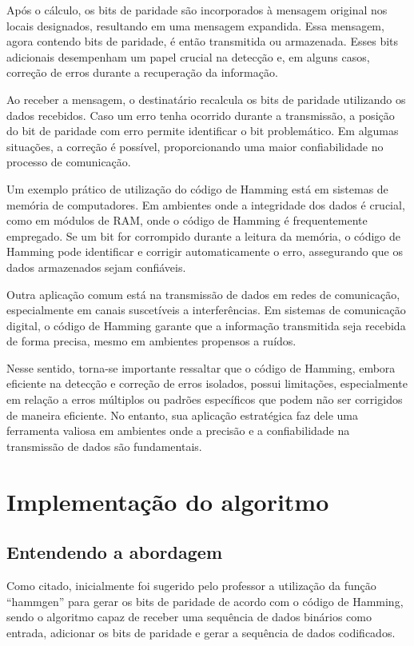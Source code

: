 \documentclass{article}
\begin{document}
Após o cálculo, os bits de paridade são incorporados à mensagem original nos locais designados, resultando em uma mensagem expandida. Essa mensagem, agora contendo bits de paridade, é então transmitida ou armazenada. Esses bits adicionais desempenham um papel crucial na detecção e, em alguns casos, correção de erros durante a recuperação da informação.

Ao receber a mensagem, o destinatário recalcula os bits de paridade utilizando os dados recebidos. Caso um erro tenha ocorrido durante a transmissão, a posição do bit de paridade com erro permite identificar o bit problemático. Em algumas situações, a correção é possível, proporcionando uma maior confiabilidade no processo de comunicação.

Um exemplo prático de utilização do código de Hamming está em sistemas de memória de computadores. Em ambientes onde a integridade dos dados é crucial, como em módulos de RAM, onde o código de Hamming é frequentemente empregado. Se um bit for corrompido durante a leitura da memória, o código de Hamming pode identificar e corrigir automaticamente o erro, assegurando que os dados armazenados sejam confiáveis.

Outra aplicação comum está na transmissão de dados em redes de comunicação, especialmente em canais suscetíveis a interferências. Em sistemas de comunicação digital, o código de Hamming garante que a informação transmitida seja recebida de forma precisa, mesmo em ambientes propensos a ruídos.

Nesse sentido, torna-se importante ressaltar que o código de Hamming, embora eficiente na detecção e correção de erros isolados, possui limitações, especialmente em relação a erros múltiplos ou padrões específicos que podem não ser corrigidos de maneira eficiente. No entanto, sua aplicação estratégica faz dele uma ferramenta valiosa em ambientes onde a precisão e a confiabilidade na transmissão de dados são fundamentais.

\section{Implementação do algoritmo}
\subsection{Entendendo a abordagem}
Como citado, inicialmente foi sugerido pelo professor a utilização da função “hammgen” para gerar os bits de paridade de acordo com o código de Hamming, sendo o algoritmo capaz de receber uma sequência de dados binários como entrada, adicionar os bits de paridade e gerar a sequência de dados codificados. 
\end{document}
